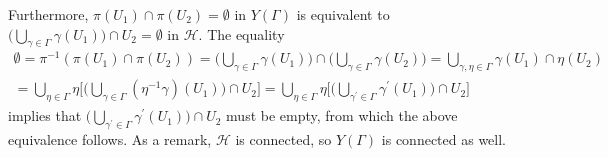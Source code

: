 \documentclass[10pt,leqno]{article}
\theoremstyle{plain}
\theoremstyle{definition}
\numberwithin{equation}{section}
\numberwithin{lem}{section}
\begin{document}
Furthermore, $\pi(U_1)\cap \pi(U_2)=\emptyset$ in $Y(\varGamma)$ is equivalent to $\big(\bigcup_{\gamma\in \varGamma}\gamma(U_1)\big)\cap U_2 = \emptyset$ in $\mathcal H$. The equality
\begin{multline}\label{eq: disjoint nbds in modular curve}
    \emptyset = \pi^{-1}(\pi(U_1)\cap \pi(U_2)) = \Bigg(\bigcup_{\gamma\in \varGamma}\gamma(U_1)\Bigg)\cap \Bigg(\bigcup_{\gamma\in \varGamma}\gamma(U_2)\Bigg) = \bigcup_{\gamma,\eta\in \varGamma}\gamma(U_1)\cap \eta(U_2)\\ = \bigcup_{\eta\in \varGamma}\eta\Bigg[\Bigg(\bigcup_{\gamma\in \varGamma}(\eta^{-1}\gamma)(U_1)\Bigg)\cap U_2\Bigg] = \bigcup_{\eta\in \varGamma}\eta\Bigg[\Bigg(\bigcup_{\gamma^\prime\in \varGamma}\gamma^\prime(U_1)\Bigg)\cap U_2\Bigg]
\end{multline}
implies that $\big(\bigcup_{\gamma^\prime\in \varGamma}\gamma^\prime(U_1)\big)\cap U_2$ must be empty, from which the above equivalence follows.
As a remark, $\mathcal H$ is connected, so $Y(\varGamma)$ is connected as well.
\end{document}
